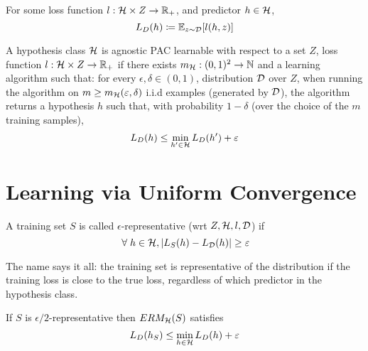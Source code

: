 \documentclass[a4paper, 10pt]{article}
\begin{document}
    \begin{definition} 
    For some loss function $l: \mathcal{H} \times Z \to \mathbb{R}_+$, and predictor $h \in \mathcal{H}$,
    \begin{equation*}
    L_D(h) \coloneqq \mathbb{E}_{z \sim \mathcal{D}}[l(h, z)]
    \end{equation*}
    \end{definition}
    \begin{definition} 
        A hypothesis class $\mathcal{H}$ is agnostic PAC learnable with respect to a set $Z$, loss function $l: \mathcal{H} \times Z \to \mathbb{R}_{+}$ if there exists $m_{\mathcal{H}}: (0, 1)^2 \to \mathbb{N}$ and a learning algorithm such that: for every $\epsilon, \delta \in (0, 1)$, distribution $\mathcal{D}$ over $Z$, when running the algorithm on $m \geq m_{\mathcal{H}} (\varepsilon, \delta)$ i.i.d examples (generated by $\mathcal{D}$), the algorithm returns a hypothesis $h$ such that, with probability $1- \delta$ (over the choice of the $m$ training samples), \begin{equation*}
        L_D(h) \leq \min_{h' \in \mathcal{H}} L_D (h') + \varepsilon
        \end{equation*}
        \end{definition}


   \section{Learning via Uniform Convergence}
    
    \begin{definition} 
    A training set $S$ is called $\epsilon$-representative (wrt $Z, \mathcal{H}, l, \mathcal{D}$) if \begin{equation*}
    \forall h \in \calh, \abs{L_S(h) - L_\cald(h)} \geq \epsilon
    \end{equation*} 

    The name says it all: the training set is representative of the distribution if the training loss is close to the true loss, regardless of which predictor in the hypothesis class.
    \end{definition}

    \begin{lemma}
    If $S$ is $\epsilon/2$-representative then $ERM_{\mathcal{H}}(S)$ satisfies \begin{equation*}
    L_D(h_S) \leq \min_{h \in \mathcal{H}} L_D(h) + \varepsilon
    \end{equation*}
    \end{lemma}
\end{document}
